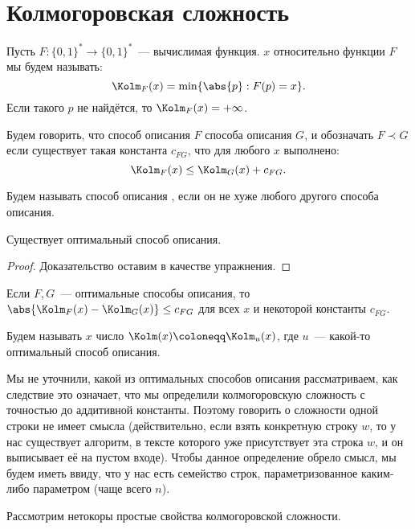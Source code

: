 \section{Колмогоровская сложность}

\begin{definition}
    Пусть $F\colon \{0, 1\}^{*} \to \{0, 1\}^{*}$~--- вычислимая функция. 
    $x$ относительно  функции $F$ мы будем называть:
    $$
        \Kolm_F(x) = \min\{\abs{p} : F(p) = x\}.
    $$ 
    Если такого $p$ не найдётся, то $\Kolm_F(x) = +\infty$.
    
    Будем говорить, что способ описания $F$  способа описания $G$, и обозначать $F \prec
    G$ если существует такая константа $c_{FG}$, что для любого $x$ выполнено:
    $$
        \Kolm_F(x) \le \Kolm_G(x) + c_{FG}.
    $$

    Будем называть способ описания , если он не хуже любого другого способа
    описания.
\end{definition}

\begin{theorem}
    Существует оптимальный способ описания.
\end{theorem}

\begin{proof}
    Доказательство оставим в качестве упражнения.
\end{proof}

Если $F, G$~--- оптимальные способы описания, то $\abs{\Kolm_F(x) - \Kolm_G(x)} \le c_{FG}$ для всех $x$
и некоторой константы $c_{FG}$.

\begin{definition}
    Будем называть  $x$ число $\Kolm(x) \coloneqq \Kolm_u(x)$, где
    $u$~--- какой-то оптимальный способ описания.
\end{definition}

Мы не уточнили, какой из оптимальных способов описания рассматриваем, как следствие это означает, что мы
определили колмогоровскую сложность с точностью до аддитивной константы. Поэтому говорить о сложности
одной строки не имеет смысла (действительно, если взять конкретную строку $w$, то у нас существует
алгоритм, в тексте которого уже присутствует эта строка $w$, и он выписывает её на пустом входе). 
Чтобы данное определение обрело смысл, мы будем иметь ввиду, что у нас есть семейство строк,
параметризованное каким-либо параметром (чаще всего $n$).

Рассмотрим нетокоры простые свойства колмогоровской сложности.

